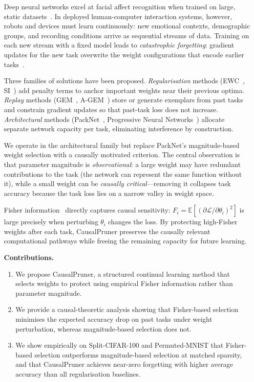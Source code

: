 \documentclass[conference]{IEEEtran}
\begin{document}
Deep neural networks excel at facial affect recognition when trained on large, static
datasets~\cite{mollahosseini2019affectnet}.  In deployed human-computer interaction
systems, however, robots and devices must learn continuously: new emotional contexts,
demographic groups, and recording conditions arrive as sequential streams of data.
Training on each new stream with a fixed model leads to \emph{catastrophic forgetting}:
gradient updates for the new task overwrite the weight configurations that encode earlier
tasks~\cite{mccloskey1989catastrophic}.

Three families of solutions have been proposed.  \emph{Regularisation} methods
(EWC~\cite{kirkpatrick2017overcoming}, SI~\cite{zenke2017continual}) add penalty terms
to anchor important weights near their previous optima.
\emph{Replay} methods (GEM~\cite{lopezpaz2017gradient}, A-GEM~\cite{chaudhry2019efficient})
store or generate exemplars from past tasks and constrain gradient updates so that
past-task loss does not increase.
\emph{Architectural} methods (PackNet~\cite{mallya2018packnet},
Progressive Neural Networks~\cite{rusu2016progressive}) allocate separate network
capacity per task, eliminating interference by construction.

We operate in the architectural family but replace PackNet's magnitude-based weight
selection with a causally motivated criterion.  The central observation is that
parameter magnitude is \emph{observational}: a large weight may have redundant
contributions to the task (the network can represent the same function without it),
while a small weight can be \emph{causally critical}---removing it collapses task
accuracy because the task loss lies on a narrow valley in weight space.

Fisher information~\cite{amari1998natural} directly captures causal sensitivity:
$F_i = \mathbb{E}[({\partial\mathcal{L}}/{\partial\theta_i})^2]$ is large
precisely when perturbing $\theta_i$ changes the loss.  By protecting high-Fisher
weights after each task, CausalPruner preserves the causally relevant computational
pathways while freeing the remaining capacity for future learning.

\textbf{Contributions.}
\begin{enumerate}
    \item We propose CausalPruner, a structured continual learning method that selects
    weights to protect using empirical Fisher information rather than parameter magnitude.
    \item We provide a causal-theoretic analysis showing that Fisher-based selection
    minimises the expected accuracy drop on past tasks under weight perturbation,
    whereas magnitude-based selection does not.
    \item We show empirically on Split-CIFAR-100 and Permuted-MNIST that Fisher-based
    selection outperforms magnitude-based selection at matched sparsity, and that
    CausalPruner achieves near-zero forgetting with higher average accuracy than all
    regularisation baselines.
\end{enumerate}
\end{document}
